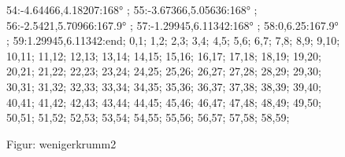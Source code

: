 \documentclass[a4paper,10pt,ngerman]{scrartcl}
\begin{document}
\begin{algorithm}[H]
\begin{figure}[!h]
{                54:-4.64466,4.18207:168° ;
                55:-3.67366,5.05636:168° ;
                56:-2.5421,5.70966:167.9° ;
                57:-1.29945,6.11342:168° ;
                58:0,6.25:167.9° ;
                59:1.29945,6.11342:end;
            }{
                0,1;
                1,2;
                2,3;
                3,4;
                4,5;
                5,6;
                6,7;
                7,8;
                8,9;
                9,10;
                10,11;
                11,12;
                12,13;
                13,14;
                14,15;
                15,16;
                16,17;
                17,18;
                18,19;
                19,20;
                20,21;
                21,22;
                22,23;
                23,24;
                24,25;
                25,26;
                26,27;
                27,28;
                28,29;
                29,30;
                30,31;
                31,32;
                32,33;
                33,34;
                34,35;
                35,36;
                36,37;
                37,38;
                38,39;
                39,40;
                40,41;
                41,42;
                42,43;
                43,44;
                44,45;
                45,46;
                46,47;
                47,48;
                48,49;
                49,50;
                50,51;
                51,52;
                52,53;
                53,54;
                54,55;
                55,56;
                56,57;
                57,58;
                58,59;
            }
            \caption{Figur: wenigerkrumm2}
            \label{fig:wenigerkrumm2}
        \end{figure}
        \newpage
        \begin{figure}[!h]
            \centering
\end{figure}
\end{algorithm}
\end{document}
